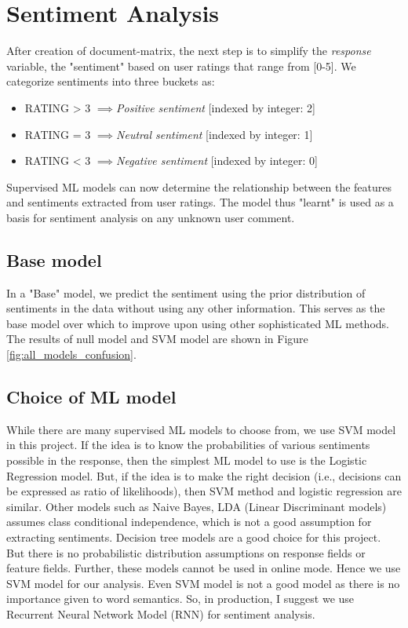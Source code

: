 \documentclass[11pt, letterpaper]{article}
\newcommand{\impl}{$\implies$}
\begin{document}
\section{Sentiment Analysis} 
After creation of document-matrix, the next step is to simplify the \textit{response} variable, the "sentiment" based on user ratings that range from [0-5]. We categorize sentiments into three buckets as:
\begin{itemize}
    \item RATING > 3 \impl \textit{Positive sentiment} [indexed by integer: 2]
    \item RATING = 3 \impl \textit{Neutral sentiment} [indexed by integer: 1]
    \item RATING < 3 \impl \textit{Negative sentiment} [indexed by integer: 0]
\end{itemize}
Supervised ML models can now determine the relationship between the features and sentiments extracted from user ratings. The model thus "learnt" is used as a basis for sentiment analysis on any unknown user comment.

\subsection{Base model}
In a "Base" model, we predict the sentiment using the prior distribution of sentiments in the data without using any other information. This serves as the base model over which to improve upon using other sophisticated ML methods. The results of null model and SVM model are shown in Figure \ref{fig:all_models_confusion}.


\subsection{Choice of ML model}
While there are many supervised ML models to choose from, we use SVM model in this project. If the idea is to know the probabilities of various sentiments possible in the response, then the simplest ML model to use is the Logistic Regression model. But, if the idea is to make the right decision (i.e., decisions  can be expressed as ratio of likelihoods), then SVM method and logistic regression are similar. Other models such as Naive Bayes, LDA (Linear Discriminant models) assumes class conditional independence, which is not a good assumption for extracting sentiments. Decision tree models are a good choice for this project. But there is no probabilistic distribution assumptions on response fields or feature fields. Further, these models cannot be used in online mode. Hence we use SVM model for our analysis. Even SVM model is not a good model as there is no importance given to word semantics. So, in production, I suggest we use Recurrent Neural Network Model (RNN) for sentiment analysis.
\end{document}
